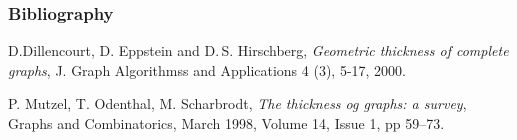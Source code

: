 \documentclass[12 pt]{beamer}
\begin{document}
\begin{frame}{}
    \frametitle{Bibliography}
    
    
    \begin{thebibliography}{ABC9999}

    D.Dillencourt, D. Eppstein and D.\,S. Hirschberg,
    \textit{Geometric thickness of complete graphs}, 
        J. Graph Algorithmss and Applications 4 (3), 5-17, 2000.
	    
    P. Mutzel, T. Odenthal, M. Scharbrodt, 
    \textit{The thickness og graphs: a survey}, 
        Graphs and Combinatorics, March 1998, Volume 14, Issue 1, pp 59–73.
    \end{thebibliography}
        
\end{frame}
\end{document}
